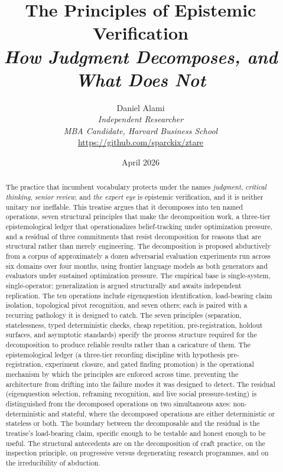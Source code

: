 \documentclass[11pt]{article}
\title{The Principles of Epistemic Verification\\
\large \textit{How Judgment Decomposes, and What Does Not}}
\author{Daniel Alami \\
\normalsize \textit{Independent Researcher} \\
\normalsize \textit{MBA Candidate, Harvard Business School} \\
\normalsize \url{https://github.com/sparckix/ztare}}
\date{April 2026}
\begin{document}
\maketitle

\begin{abstract}
The practice that incumbent vocabulary protects under the names \emph{judgment}, \emph{critical thinking}, \emph{senior review}, and \emph{the expert eye} is epistemic verification, and it is neither unitary nor ineffable. This treatise argues that it decomposes into ten named operations, seven structural principles that make the decomposition work, a three-tier epistemological ledger that operationalizes belief-tracking under optimization pressure, and a residual of three commitments that resist decomposition for reasons that are structural rather than merely engineering. The decomposition is proposed abductively from a corpus of approximately a dozen adversarial evaluation experiments run across six domains over four months, using frontier language models as both generators and evaluators under sustained optimization pressure. The empirical base is single-system, single-operator; generalization is argued structurally and awaits independent replication. The ten operations include eigenquestion identification, load-bearing claim isolation, topological pivot recognition, and seven others; each is paired with a recurring pathology it is designed to catch. The seven principles (separation, statelessness, typed deterministic checks, cheap repetition, pre-registration, holdout surfaces, and asymptotic standards) specify the process structure required for the decomposition to produce reliable results rather than a caricature of them. The epistemological ledger (a three-tier recording discipline with hypothesis pre-registration, experiment closure, and gated finding promotion) is the operational mechanism by which the principles are enforced across time, preventing the architecture from drifting into the failure modes it was designed to detect. The residual (eigenquestion selection, reframing recognition, and live social pressure-testing) is distinguished from the decomposed operations on two simultaneous axes: non-deterministic and stateful, where the decomposed operations are either deterministic or stateless or both. The boundary between the decomposable and the residual is the treatise's load-bearing claim, specific enough to be testable and honest enough to be useful. The structural antecedents are \citet{taylor1911} on the decomposition of craft practice, \citet{bentham1787} on the inspection principle, \citet{lakatos1978} on progressive versus degenerating research programmes, and \citet{peirce1878} on the irreducibility of abduction.
\end{abstract}
\end{document}
